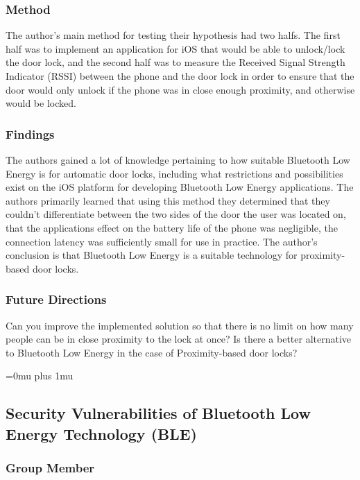 \subsubsection{Method}

\noindent
The author’s main method for testing their hypothesis had two halfs. The first half was to implement an application for iOS that would be able to unlock/lock the door lock, and the second half was to measure the Received Signal Strength Indicator (RSSI) between the phone and the door lock in order to ensure that the door would only unlock if the phone was in close enough proximity, and otherwise would be locked.

\subsubsection{Findings}

\noindent
The authors gained a lot of knowledge pertaining to how suitable Bluetooth Low Energy is for automatic door locks, including what restrictions and possibilities exist on the iOS platform for developing Bluetooth Low Energy applications. The authors primarily learned that using this method they determined that they couldn’t differentiate between the two sides of the door the user was located on, that the applications effect on the battery life of the phone was negligible, the connection latency was sufficiently small for use in practice. The author's conclusion is that Bluetooth Low Energy is a suitable technology for proximity-based door locks.


\subsubsection{Future Directions}

\noindent
Can you improve the implemented solution so that there is no limit on how many people can be in close proximity to the lock at once? Is there a better alternative to Bluetooth Low Energy in the case of Proximity-based door locks?


\Urlmuskip=0mu plus 1mu\relax

\subsection{Security Vulnerabilities of Bluetooth Low Energy Technology (BLE)}

\subsubsection{Group Member}

